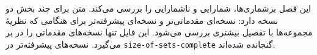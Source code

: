 \documentclass[../../../include/open-logic-chapter]{subfiles}
\begin{document}

\begin{editorial}
این فصل برشماری‌ها، شمارایی و ناشمارایی را بررسی می‌کند. متن برای چند
بخش دو نسخه دارد: نسخه‌ای مقدماتی‌تر و نسخه‌ای پیشرفته‌تر برای هنگامی که
نظریهٔ مجموعه‌ها با تفصیل بیشتری بررسی می‌شود. این فایل تنها نسخه‌های
مقدماتی را در بر می‌گیرد. نسخه‌های پیشرفته‌تر در
\verb|size-of-sets-complete| گنجانده شده‌اند.
\end{editorial}











\OLEndChapterHook
\end{document}
